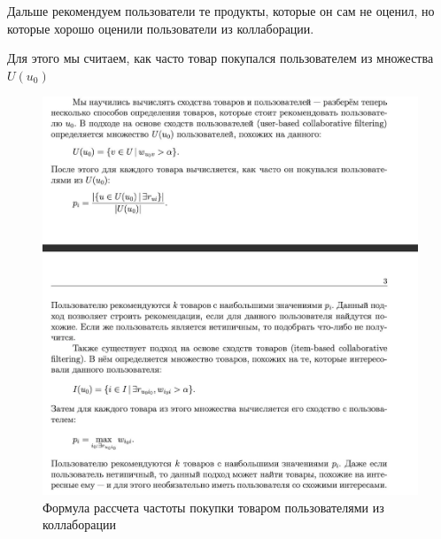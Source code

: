 	Дальше рекомендуем пользователи те продукты, которые он сам не оценил, но которые хорошо оценили пользователи из коллаборации. 
	
	Для этого мы считаем, как часто товар покупался пользователем из множества $U(u_0) $
		

	
			\begin{figure}[H]
\centering
\includegraphics[width=0.7\linewidth]{16_memory2.jpg}
\caption{Формула рассчета частоты покупки товаром пользователями из коллаборации}
\label{fig:16_memory2} 
\end{figure}
